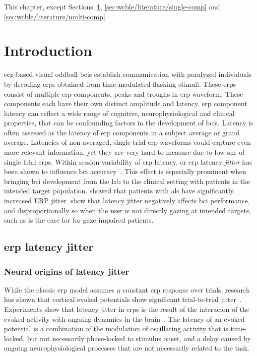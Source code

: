 
This chapter, except Sections~\ref{sec:wcble/intro},
\ref{sec:wcble/literature/single-comp} and
\ref{sec:wcble/literature/multi-comp}

\section{Introduction}
\label{sec:wcble/intro}

\Ac{eeg}-based visual oddball \acp{bci} establish communication with paralyzed
individuals by decoding \acp{erp} obtained from time-modulated flashing
stimuli.
These \acp{erp} consist of multiple \ac{erp}-components, peaks and troughs in
\ac{erp} waveform.
These components each have their own distinct amplitude and latency.
\Ac{erp} component latency can reflect a wide range of cognitive,
neurophysiological and clinical properties, that can be confounding factors in
the development of \acp{bci}.
Latency is often assessed as the latency of \ac{erp} components in a subject
average or grand average.
Latencies of non-averaged, single-trial \ac{erp} waveforms could capture even more
relevant information, yet they are very hard to measure due to low \ac{snr} of
single trial \acp{erp}.
Within session variability of \ac{erp} latency, or \ac{erp} latency
\emph{jitter} has been shown to influence \ac{bci}
accuracy~\cite{Thompson2012}.
This effect is especially prominent when bringing \ac{bci} development from the
lab to the clinical setting with patients in the intended target population.
\textcite{Zisk2021} showed that patients with \ac{als} have significantly
increased ERP jitter.
\textcite{Arico2014} show that latency jitter negatively affects \ac{bci}
performance, and disproportionally so when the user is not directly gazing at
intended targets, such as is the case for for gaze-impaired patients.

\subsection{\Ac{erp} latency jitter}

\subsubsection{Neural origins of latency jitter}
While the classic \ac{erp} model assumes a constant \ac{erp} response over trials,
research has shown that cortical evoked potentials show significant
trial-to-trial jitter~\cite{Truccolo2002}.
Experiments show that latency jitter in \acp{erp} is the result of the interacion of
the evoked activity with ongoing dynamics in the brain~\cite{Hasenstaub2007,
	Kisley1999, Curto2009, Arieli1996}.
The latency of an evoked potential is a combination of the modulation of oscillating activity that is
time-locked, but not necessarily phase-locked to stimulus onset, and a
delay caused by ongoing neurophysiological processes that are not necessarily related to the task.

